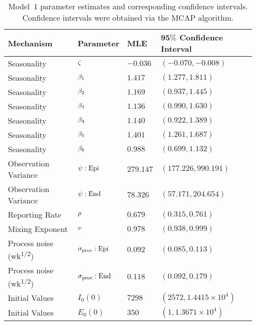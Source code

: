 \begin{table}[!h]
\centering
\caption[Model~1 parameter estimates and corresponding confidence intervals.]{\label{tab:mod1CI}Model~1 parameter estimates and corresponding confidence intervals. Confidence intervals were obtained via the MCAP algorithm.}
\vspace{2mm}
\begin{tabular}{|L{3.60cm}|C{2.1cm}|C{1.9cm}|C{3.95cm}|}
\hline
\centering \textbf{Mechanism} & \textbf{Parameter} & \textbf{MLE} & $\bm{95\%}$ \textbf{Confidence Interval} \\
\hline
\hline

 Seasonality & $\zeta$ & $-0.036$
   &
  $(-0.070, -0.008)$
\\
\hline

 Seasonality & $\beta_1$ & $1.417$
   &
  $(1.277, 1.811)$
\\
\hline

 Seasonality & $\beta_2$ & $1.169$
   &
  $(0.937, 1.445)$
\\
\hline

 Seasonality & $\beta_3$ & $1.136$
   &
  $(0.990, 1.630)$
\\
\hline

 Seasonality & $\beta_4$ & $1.140$
   &
  $(0.922, 1.389)$
\\
\hline

 Seasonality & $\beta_5$ & $1.401$
   &
  $(1.261, 1.687)$
\\
\hline

 Seasonality & $\beta_6$ & $0.988$
   &
  $(0.699, 1.132)$
\\
\hline

 Observation Variance & $\psi: \mathrm{Epi}$ & $279.147$
   &
  $(177.226, 990.191)$
\\
\hline

 Observation Variance & $\psi: \mathrm{End}$ & $78.326$
   &
  $(57.171, 204.654)$
\\
\hline

  Reporting Rate & $\rho$ & $0.679$
   &
  $(0.315, 0.761)$
\\
\hline

  Mixing Exponent & $\nu$ & $0.978$
   &
  $(0.938, 0.999)$
\\
\hline

  Process noise {\footnotesize (wk\textsuperscript{1/2})} & $\sigma_{\mathrm{proc}}: \mathrm{Epi}$ & $0.092$
   &
  $(0.085, 0.113)$
\\
\hline

  Process noise {\footnotesize (wk\textsuperscript{1/2})} & $\sigma_{\mathrm{proc}}: \mathrm{End}$ & $0.118$
   &
  $(0.092, 0.179)$
\\
\hline

  Initial Values & $I_{0}(0)$ & $7298$
   &
  $(2572, \ensuremath{1.4415\times 10^{4}})$
\\
\hline

  Initial Values & $E_{0}(0)$ & $350$
   &
  $(1, \ensuremath{1.3671\times 10^{4}})$
\\
\hline

\end{tabular}
\end{table}

